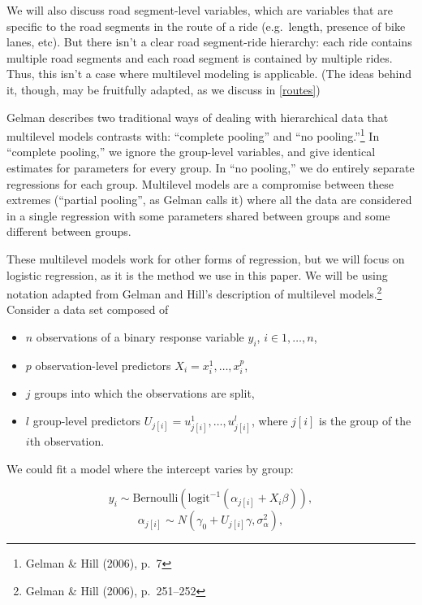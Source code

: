 \documentclass[12pt,twoside]{reedthesis}
\providecommand{\tightlist}{%
  \setlength{\itemsep}{0pt}\setlength{\parskip}{0pt}}
\begin{document}
  We will also discuss road segment-level variables, which are variables
  that are specific to the road segments in the route of a ride
  (e.g.~length, presence of bike lanes, etc). But there isn't a clear road
  segment-ride hierarchy: each ride contains multiple road segments and
  each road segment is contained by multiple rides. Thus, this isn't a
  case where multilevel modeling is applicable. (The ideas behind it,
  though, may be fruitfully adapted, as we discuss in \autoref{routes})
  
  Gelman describes two traditional ways of dealing with hierarchical data
  that multilevel models contrasts with: ``complete pooling'' and ``no
  pooling.''\footnote{Gelman \& Hill (2006), p.~7} In ``complete
  pooling,'' we ignore the group-level variables, and give identical
  estimates for parameters for every group. In ``no pooling,'' we do
  entirely separate regressions for each group. Multilevel models are a
  compromise between these extremes (``partial pooling'', as Gelman calls
  it) where all the data are considered in a single regression with some
  parameters shared between groups and some different between groups.
  
  These multilevel models work for other forms of regression, but we will
  focus on logistic regression, as it is the method we use in this paper.
  We will be using notation adapted from Gelman and Hill's description of
  multilevel models.\footnote{Gelman \& Hill (2006), p.~251--252} Consider
  a data set composed of
  
  \begin{itemize}
  \tightlist
  \item
    \(n\) observations of a binary response variable \(y_i\),
    \(i \in 1, \ldots, n\),
  \item
    \(p\) observation-level predictors \(X_i = x_i^1, \ldots, x_i^p\),
  \item
    \(j\) groups into which the observations are split,
  \item
    \(l\) group-level predictors
    \(U_{j[i]} = u_{j[i]}^1, \ldots, u_{j[i]}^l\), where \(j[i]\) is the
    group of the \(i\)th observation.
  \end{itemize}
  
  We could fit a model where the intercept varies by group:
  
  \begin{equation}
  y_i \sim \text{Bernoulli} \left( \text{logit}^{-1}
  \left( \alpha_{j[i]} + X_i \beta  \right) \right),
  \end{equation}\begin{equation}
  \alpha_{j[i]} \sim N(\gamma_0 + U_{j[i]} \gamma, \sigma_{\alpha}^2),
  \end{equation}
  
\end{document}
